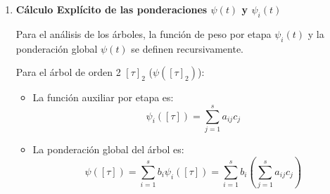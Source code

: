 \begin{sol}
\begin{enumerate}
\begin{enumerate}
    \item \textbf{Orden 3:}
    Evaluamos las dos condiciones correspondientes a los árboles de orden 3 ($[\tau^2]$ y $[[\tau]]$):
    \begin{itemize}
        \item Para $[\tau^2]$ ($\gamma = 3$):
        \[
        \psi([\tau^2]) = \sum_{i=1}^2 b_i c_i^2 = \frac{1}{4}(0)^2 + \frac{3}{4}\left(\frac{2}{3}\right)^2 = \frac{3}{4}\left(\frac{4}{9}\right) = \frac{3}{9} = \frac{1}{3} \quad \checkmark
        \]
        \item Para $[[\tau]]$ ($\gamma = 6$):
        \[
        \psi([[\tau]]) = \sum_{i,j=1}^2 b_i a_{ij} c_j = b_2 \left( a_{21}c_1 + a_{22}c_2 \right) = \frac{3}{4} \left( \frac{1}{3}(0) + \frac{1}{3}\left(\frac{2}{3}\right) \right) = \frac{3}{4}\left(\frac{2}{9}\right) = \frac{6}{36} = \frac{1}{6} \quad \checkmark
        \]
    \end{itemize}

    \item \textbf{Orden 4:}
    Evaluamos una de las condiciones de orden 4 (por ejemplo, para el árbol $[\tau^3]$, $\gamma = 4$):
    \[
    \psi([\tau^3]) = \sum_{i=1}^2 b_i c_i^3 = \frac{1}{4}(0)^3 + \frac{3}{4}\left(\frac{2}{3}\right)^3 = \frac{3}{4}\left(\frac{8}{27}\right) = \frac{6}{27} = \frac{2}{9}\neq \frac{1}{4} \quad \cross
    \]
    Dado que el valor teórico requerido para orden 4 es $\frac{1}{\gamma} = \frac{1}{4}$, y $\frac{2}{9} \neq \frac{1}{4}$, \textbf{la condición de orden 4 no se cumple}.
\end{enumerate}

\item \textbf{Cálculo Explícito de las ponderaciones $\psi(t)$ y $\psi_i(t)$}

Para el análisis de los árboles, la función de peso por etapa $\psi_i(t)$ y la ponderación global $\psi(t)$ se definen recursivamente. 

Para el árbol de orden 2 $[\tau]_2$ ($\psi([\tau]_2)$):
\begin{itemize}
    \item La función auxiliar por etapa es:
    \[
    \psi_i([\tau]) = \sum_{j=1}^{s} a_{ij} c_j
    \]
    \item La ponderación global del árbol es:
    \[
    \psi([\tau]) = \sum_{i=1}^{s} b_i \psi_i([\tau]) = \sum_{i=1}^{s} b_i \left( \sum_{j=1}^{s} a_{ij} c_j \right)
    \]
\end{itemize}


\end{enumerate}
\end{sol}
